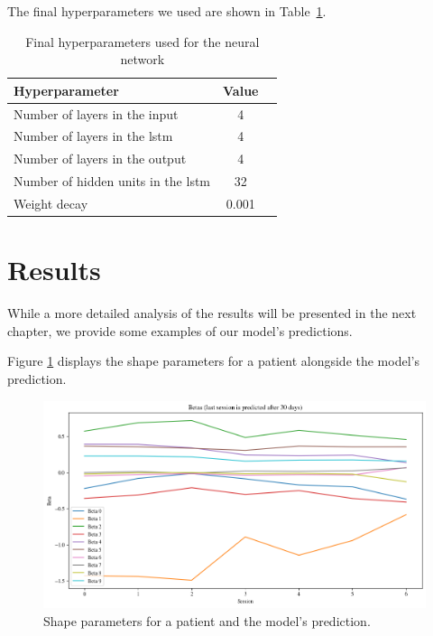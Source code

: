 The final hyperparameters we used are shown in
Table~\ref{tab:final-hyperparameters}.

\begin{table}[h]
    \centering
    \begin{tabular}{l c c}
        \toprule
        \textbf{Hyperparameter}                  & \textbf{Value} \\
        \midrule
        Number of layers in the input            & 4              \\
        Number of layers in the \gls{lstm}       & 4              \\
        Number of layers in the output           & 4              \\
        Number of hidden units in the \gls{lstm} & 32             \\
        Weight decay                             & 0.001          \\
        \bottomrule
    \end{tabular}
    \caption{Final hyperparameters used for the neural network}
    \label{tab:final-hyperparameters}
\end{table}

\section{Results}

While a more detailed analysis of the results will be presented in the next
chapter, we provide some examples of our model's predictions.

Figure \ref{fig:predicted-betas} displays the shape parameters for a patient
alongside the model's prediction.

\begin{figure}[h]
    \centering
    \includegraphics[width=\textwidth]{files/predicted_betas}
    \caption{Shape parameters for a patient and the model's prediction.}
    \label{fig:predicted-betas}
\end{figure}

